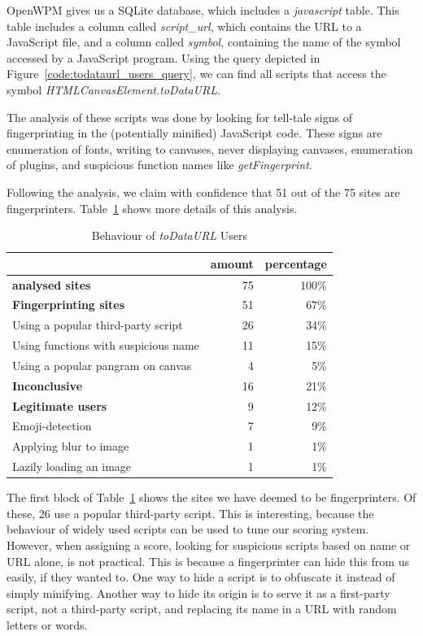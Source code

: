 \documentclass[
    fontsize=12pt,
    headings=small,
    parskip=half,
    bibliography=totoc,
    numbers=noenddot,
    open=any
    ]{scrreprt}
\begin{document}
OpenWPM gives us a SQLite database, which includes a \textit{javascript} table.
This table includes a column called \textit{script\_url}, which contains
the URL to a JavaScript file, and a column called \textit{symbol}, containing
the name of the symbol accessed by a JavaScript program.
Using the query depicted in Figure~\ref{code:todataurl_users_query}, we can find all scripts
that access the symbol \textit{HTMLCanvasElement.toDataURL}.

The analysis of these scripts was done by looking for tell-tale signs of fingerprinting
in the (potentially minified) JavaScript code.
These signs are enumeration of fonts, writing to canvases, never displaying canvases,
enumeration of plugins, and suspicious function names like \textit{getFingerprint}.

Following the analysis, we claim with confidence that 51 out of the 75 sites are fingerprinters.
Table~\ref{table:todataurl_users} shows more details of this analysis.

\begin{table}
\centering
\caption{Behaviour of \textit{toDataURL} Users}
\begin{tabular}{l r r}
    \toprule
    & amount & percentage \\
    \midrule
    \textbf{analysed sites} & 75 & 100\% \\
    \midrule
    \textbf{Fingerprinting sites} & 51 & 67\% \\
    Using a popular third-party script & 26 & 34\% \\
    Using functions with suspicious name & 11 & 15\% \\
    Using a popular pangram on canvas & 4 & 5\% \\
    \midrule
    \textbf{Inconclusive} & 16 & 21\% \\
    \midrule
    \textbf{Legitimate users} & 9 & 12\% \\
    Emoji-detection & 7 & 9\% \\
    Applying blur to image & 1 & 1\% \\
    Lazily loading an image & 1 & 1\% \\
    \bottomrule
\end{tabular}
\label{table:todataurl_users}
\end{table}

The first block of Table~\ref{table:todataurl_users} shows the sites
we have deemed to be fingerprinters. Of these, 26 use a popular third-party script.
This is interesting, because the behaviour of widely used scripts can be used to tune our scoring system.
However, when assigning a score, looking for suspicious scripts based on
name or URL alone, is not practical. This is because a fingerprinter
can hide this from us easily, if they wanted to.
One way to hide a script is to obfuscate it instead of simply minifying.
Another way to hide its origin is to serve it as a first-party script,
not a third-party script, and replacing its name in a URL with random
letters or words.
\end{document}
